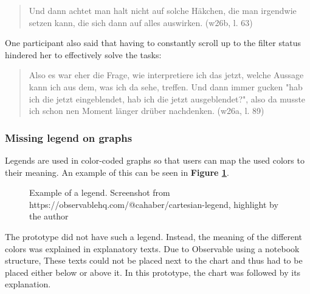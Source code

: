 \begin{quote}
    Und dann achtet man halt nicht auf solche Häkchen, die man irgendwie setzen kann, die sich dann auf alles auswirken. (w26b, l. 63)
\end{quote}

One participant also said that having to constantly scroll up to the filter status hindered her to effectively solve the tasks:

\begin{quote}
    Also es war eher die Frage, wie interpretiere ich das jetzt, welche Aussage kann ich aus dem, was ich da sehe, treffen. Und dann immer gucken "hab ich die jetzt eingeblendet, hab ich die jetzt ausgeblendet?", also da musste ich schon nen Moment länger drüber nachdenken. (w26a, l. 89)
\end{quote}

\subsubsection*{Missing legend on graphs}
Legends are used in color-coded graphs so that users can map the used colors to their meaning. An example of this can be seen in \textbf{Figure \ref{fig:legend_example}}.

\begin{figure}[h!tb]
    \centering
    \caption{Example of a legend. Screenshot from https://observablehq.com/@cahaber/cartesian-legend, highlight by the author}
    \label{fig:legend_example}
\end{figure}

The prototype did not have such a legend. Instead, the meaning of the different colors was explained in explanatory texts. Due to Observable using a notebook structure, These texts could not be placed next to the chart and thus had to be placed either below or above it. In this prototype, the chart was followed by its explanation.%

